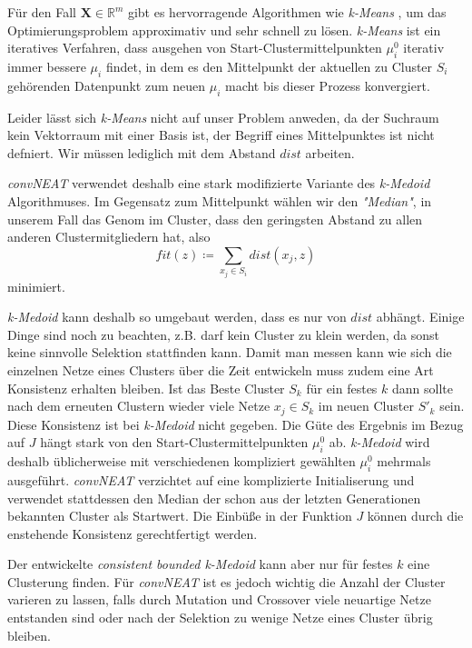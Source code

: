 \documentclass[]{scrartcl}
\begin{document}
				Für den Fall $\mathbf{X} \in \mathbb{R}^m$ gibt es hervorragende Algorithmen wie \textit{k-Means} \cite{kmeans}, um das Optimierungsproblem
				approximativ und sehr schnell zu lösen. \textit{k-Means} ist ein iteratives Verfahren, dass ausgehen von Start-Clustermittelpunkten $\mu_i^0$
				iterativ immer bessere $\mu_i$ findet, in dem es den Mittelpunkt der aktuellen zu Cluster $S_i$ gehörenden Datenpunkt zum neuen $\mu_i$ macht
				bis dieser Prozess konvergiert.

				Leider lässt sich \textit{k-Means} nicht auf unser Problem anweden, da der Suchraum kein Vektorraum mit einer Basis ist,
				der Begriff eines Mittelpunktes ist nicht defniert. Wir müssen lediglich mit dem Abstand $dist$ arbeiten. 

				\textit{convNEAT} verwendet deshalb eine stark modifizierte Variante des \textit{k-Medoid} Algorithmuses.
				Im Gegensatz zum Mittelpunkt wählen wir den \textit{"Median"}, in unserem Fall das Genom im Cluster, dass den geringsten Abstand zu allen anderen
				Clustermitgliedern hat, also $$fit(z) \coloneqq \sum _{x_j \in S_i} dist(x_j, z)$$ minimiert.

				\textit{k-Medoid} kann deshalb so umgebaut werden, dass es nur von $dist$ abhängt.
				Einige Dinge sind noch zu beachten, z.B. darf kein Cluster zu klein werden, da sonst keine sinnvolle Selektion stattfinden kann.
				Damit man messen kann wie sich die einzelnen Netze eines Clusters über die Zeit entwickeln muss zudem eine Art Konsistenz erhalten bleiben.
				Ist das Beste Cluster $S_k$ für ein festes $k$ dann sollte nach dem erneuten Clustern wieder viele Netze $x_j \in S_k$ im neuen Cluster $S'_k$ sein.
				Diese Konsistenz ist bei \textit{k-Medoid} nicht gegeben. Die Güte des Ergebnis im Bezug auf $J$ hängt stark von den Start-Clustermittelpunkten $\mu_i^0$
				ab. \textit{k-Medoid} wird deshalb üblicherweise mit verschiedenen kompliziert gewählten $\mu_i^0$ mehrmals ausgeführt.
				\textit{convNEAT} verzichtet auf eine komplizierte Initialiserung und verwendet stattdessen den Median der schon aus der letzten Generationen
				bekannten Cluster als Startwert. Die Einbüße in der Funktion $J$ können durch die enstehende Konsistenz gerechtfertigt werden.

				Der entwickelte \textit{consistent bounded k-Medoid} kann aber nur für festes $k$ eine Clusterung finden.
				Für \textit{convNEAT} ist es jedoch wichtig die Anzahl der Cluster varieren zu lassen, falls durch Mutation und Crossover viele
				neuartige Netze entstanden sind oder nach der Selektion zu wenige Netze eines Cluster übrig bleiben.
\end{document}
